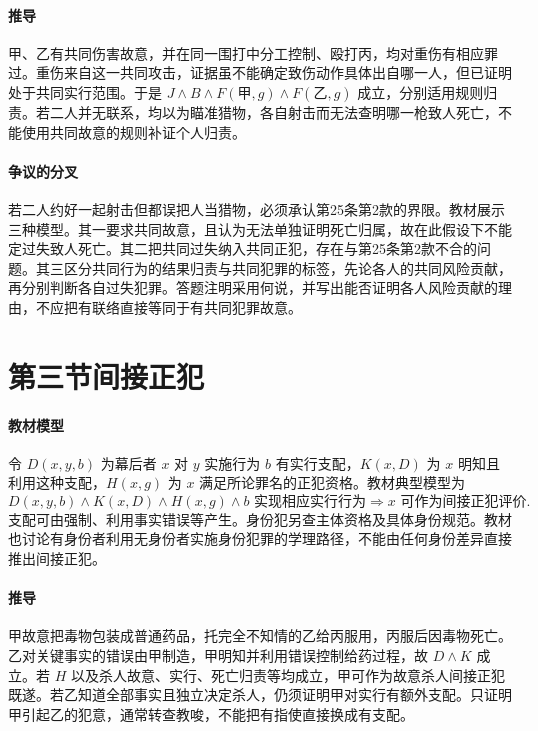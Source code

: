 \paragraph{推导}
甲、乙有共同伤害故意，并在同一围打中分工控制、殴打丙，均对重伤有相应罪过。重伤来自这一共同攻击，证据虽不能确定致伤动作具体出自哪一人，但已证明处于共同实行范围。于是 \(J\land B\land F(\text{甲},g)\land F(\text{乙},g)\) 成立，分别适用规则归责。若二人并无联系，均以为瞄准猎物，各自射击而无法查明哪一枪致人死亡，不能使用共同故意的规则补证个人归责。

\paragraph{争议的分叉}
若二人约好一起射击但都误把人当猎物，必须承认第25条第2款的界限。教材展示三种模型。其一要求共同故意，且认为无法单独证明死亡归属，故在此假设下不能定过失致人死亡。其二把共同过失纳入共同正犯，存在与第25条第2款不合的问题。其三区分共同行为的结果归责与共同犯罪的标签，先论各人的共同风险贡献，再分别判断各自过失犯罪。答题注明采用何说，并写出能否证明各人风险贡献的理由，不应把有联络直接等同于有共同犯罪故意。

\section{第三节\quad 间接正犯}

\paragraph{教材模型}
令 \(D(x,y,b)\) 为幕后者 \(x\) 对 \(y\) 实施行为 \(b\) 有实行支配，\(K(x,D)\) 为 \(x\) 明知且利用这种支配，\(H(x,g)\) 为 \(x\) 满足所论罪名的正犯资格。教材典型模型为
\[
D(x,y,b)\land K(x,D)\land H(x,g)\land
\text{\(b\) 实现相应实行行为}
\Longrightarrow \text{\(x\) 可作为间接正犯评价}.
\]
支配可由强制、利用事实错误等产生。身份犯另查主体资格及具体身份规范。教材也讨论有身份者利用无身份者实施身份犯罪的学理路径，不能由任何身份差异直接推出间接正犯。

\paragraph{推导}
甲故意把毒物包装成普通药品，托完全不知情的乙给丙服用，丙服后因毒物死亡。乙对关键事实的错误由甲制造，甲明知并利用错误控制给药过程，故 \(D\land K\) 成立。若 \(H\) 以及杀人故意、实行、死亡归责等均成立，甲可作为故意杀人间接正犯既遂。若乙知道全部事实且独立决定杀人，仍须证明甲对实行有额外支配。只证明甲引起乙的犯意，通常转查教唆，不能把有指使直接换成有支配。

